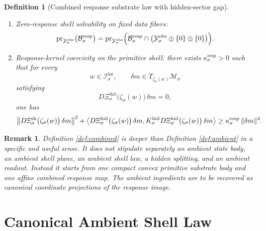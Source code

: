 \documentclass[11pt]{article}
\newcommand{\ForSpace}[1]{\mathcal I_{#1}^{\mathrm{for}}}
\newcommand{\CurrentCarrier}[1]{\mathfrak C_{#1}^{\mathrm{cur}}}
\newcommand{\EqCarrier}[1]{\mathfrak C_{#1}^{\mathrm{eq}}}
\newcommand{\DataSpace}[1]{\mathcal Y_{#1}^{\mathrm{obs}}}
\newcommand{\HiddenOperator}[1]{K_{#1}^{\mathrm{hid}}}
\newcommand{\ProtoSpace}[1]{\mathcal M_{#1}}
\newcommand{\ResponseData}[1]{\Xi_{#1}^{\mathrm{dat}}}
\newcommand{\ResponseShell}[1]{\Xi_{#1}^{\mathrm{sh}}}
\newcommand{\ResponseHidden}[1]{\Xi_{#1}^{\mathrm{hid}}}
\newcommand{\ResponseImage}[1]{\mathcal B_{#1}^{\mathrm{resp}}}
\newcommand{\ProtoEmbed}[1]{\zeta_{#1}}
\newtheorem{definition}{Definition}
\newtheorem{remark}{Remark}
\begin{document}
\begin{definition}[Combined response substrate law with hidden-sector gap]
\begin{enumerate}
\begin{equation}
    \CurrentCarrier{\sigma}(w),
    \EqCarrier{\sigma}(w)
    \bigr)
    \label{eq:combinedcompat}
    \end{equation}
    for every \(w\in\ForSpace{\sigma}\).
    \item Zero-response shell solvability on fixed data fibers:
    \begin{equation}
    \operatorname{pr}_{\DataSpace{\sigma}}\bigl(\ResponseImage{\sigma}\bigr)
    =
    \operatorname{pr}_{\DataSpace{\sigma}}
    \Bigl(
    \ResponseImage{\sigma}\cap
    \bigl(
    \DataSpace{\sigma}\oplus\{0\}\oplus\{0\}
    \bigr)
    \Bigr).
    \label{eq:combinedsolvability}
    \end{equation}
    \item Response-kernel coercivity on the primitive shell: there exists \(\kappa_{\sigma}^{\mathrm{resp}}>0\) such that for every
    \[
    w\in\ForSpace{\sigma},
    \qquad
    \delta m\in T_{\ProtoEmbed{\sigma}(w)}\ProtoSpace{\sigma}
    \]
    satisfying
    \[
    D\ResponseData{\sigma}\bigl(\ProtoEmbed{\sigma}(w)\bigr)\,\delta m=0,
    \]
    one has
    \begin{equation}
    \bigl\|
    D\ResponseShell{\sigma}\bigl(\ProtoEmbed{\sigma}(w)\bigr)\,\delta m
    \bigr\|^{2}
    +
    \ev{
    D\ResponseHidden{\sigma}\bigl(\ProtoEmbed{\sigma}(w)\bigr)\,\delta m,
    \HiddenOperator{\sigma}
    D\ResponseHidden{\sigma}\bigl(\ProtoEmbed{\sigma}(w)\bigr)\,\delta m
    }
    \ge
    \kappa_{\sigma}^{\mathrm{resp}}\,
    \|\delta m\|^{2}.
    \label{eq:combinedcoercive}
    \end{equation}
\end{enumerate}
\end{definition}

\begin{remark}
Definition \ref{def:combined} is deeper than Definition \ref{def:ambient} in a specific and useful sense. It does not stipulate separately an ambient state body, an ambient shell plane, an ambient shell law, a hidden splitting, and an ambient readout. Instead it starts from one compact convex primitive substrate body and one affine combined response map. The ambient ingredients are to be recovered as canonical coordinate projections of the response image.
\end{remark}

\section{Canonical Ambient Shell Law}
\end{document}

